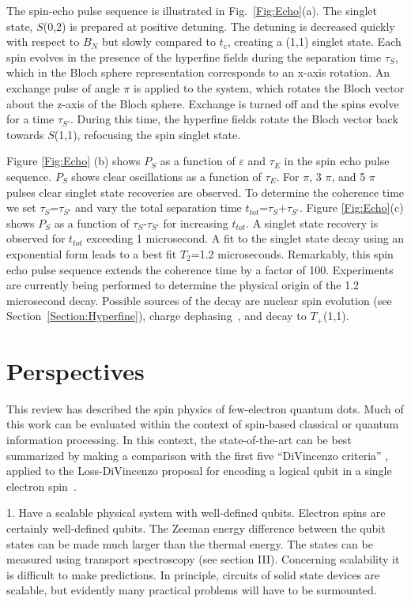 \documentclass[rmp,twocolumn,aps]{revtex4}
\begin{document}
The spin-echo pulse sequence is illustrated in Fig.~\ref{Fig:Echo}(a). The singlet state, $S$(0,2) is prepared at
positive detuning. The detuning is decreased quickly with respect
to $B_{N}$ but slowly compared to $t_c$, creating a (1,1)
singlet state. Each spin evolves in the presence of the hyperfine
fields during the separation time $\tau_S$, which in the Bloch
sphere representation corresponds to an x-axis rotation. An
exchange pulse of angle $\pi$ is applied to the system, which
rotates the Bloch vector about the z-axis of the Bloch sphere.
Exchange is turned off and the spins evolve for a time
$\tau_{S'}$. During this time, the hyperfine fields rotate the
Bloch vector back towards $S$(1,1), refocusing the spin singlet
state.

Figure \ref{Fig:Echo} (b) shows $P_S$ as a function of $\varepsilon$
and $\tau_E$ in the spin echo pulse sequence. $P_S$ shows clear
oscillations as a function of $\tau_E$. For $\pi$, 3 $\pi$, and 5
$\pi$ pulses clear singlet state recoveries are observed. To
determine the coherence time we set $\tau_S$=$\tau_{S'}$ and vary
the total separation time $t_{tot}$=$\tau_S$+$\tau_{S'}$. Figure
\ref{Fig:Echo}(c) shows $P_S$ as a function of $\tau_S$-$\tau_{S'}$ for
increasing $t_{tot}$. A singlet state recovery is observed for
$t_{tot}$ exceeding 1 microsecond. A fit to the singlet state
decay using an exponential form leads to a best fit $T_2$=1.2
microseconds. Remarkably, this spin echo pulse sequence extends
the coherence time by a factor of 100. Experiments are currently
being performed to determine the physical origin of the 1.2
microsecond decay. Possible sources of the decay are nuclear spin
evolution (see Section~\ref{Section:Hyperfine}), charge dephasing~\cite{Hu06}, and decay to $T_+$(1,1).

\section{Perspectives}

This review has described the spin physics of few-electron quantum dots. Much of this work can be evaluated within the context of spin-based classical or quantum information processing. In this context, the state-of-the-art can be best summarized by making a comparison with the first five ``DiVincenzo criteria'' \cite{DiVincenzo_criteria}, applied to the Loss-DiVincenzo proposal for encoding a logical qubit in a single electron spin~\cite{LossDiVincenzo}.

1. Have a scalable
physical system with well-defined qubits. Electron spins are
certainly well-defined qubits. The Zeeman energy difference
between the qubit states can be made much larger than the thermal
energy. The states can be measured using transport spectroscopy
(see section III). Concerning scalability it is difficult to make
predictions. In principle, circuits of solid state devices are
scalable, but evidently many practical problems will have to be surmounted.
\end{document}
